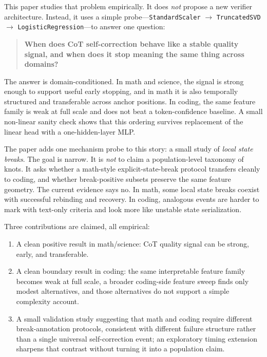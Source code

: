 \documentclass[10pt]{article}
\begin{document}
This paper studies that problem empirically. It does \emph{not} propose a new verifier architecture. Instead, it uses a simple probe---\texttt{StandardScaler} $\rightarrow$ \texttt{TruncatedSVD} $\rightarrow$ \texttt{LogisticRegression}---to answer one question:
\begin{quote}
\textbf{When does CoT self-correction behave like a stable quality signal, and when does it stop meaning the same thing across domains?}
\end{quote}

The answer is domain-conditioned. In math and science, the signal is strong enough to support useful early stopping, and in math it is also temporally structured and transferable across anchor positions. In coding, the same feature family is weak at full scale and does not beat a token-confidence baseline. A small non-linear sanity check shows that this ordering survives replacement of the linear head with a one-hidden-layer MLP.

The paper adds one mechanism probe to this story: a small study of \emph{local state breaks}. The goal is narrow. It is \emph{not} to claim a population-level taxonomy of knots. It asks whether a math-style explicit-state-break protocol transfers cleanly to coding, and whether break-positive subsets preserve the same feature geometry. The current evidence says no. In math, some local state breaks coexist with successful rebinding and recovery. In coding, analogous events are harder to mark with text-only criteria and look more like unstable state serialization.

Three contributions are claimed, all empirical:
\begin{enumerate}
    \item A clean positive result in math/science: CoT quality signal can be strong, early, and transferable.
    \item A clean boundary result in coding: the same interpretable feature family becomes weak at full scale, a broader coding-side feature sweep finds only modest alternatives, and those alternatives do not support a simple complexity account.
    \item A small validation study suggesting that math and coding require different break-annotation protocols, consistent with different failure structure rather than a single universal self-correction event; an exploratory timing extension sharpens that contrast without turning it into a population claim.
\end{enumerate}
\end{document}

